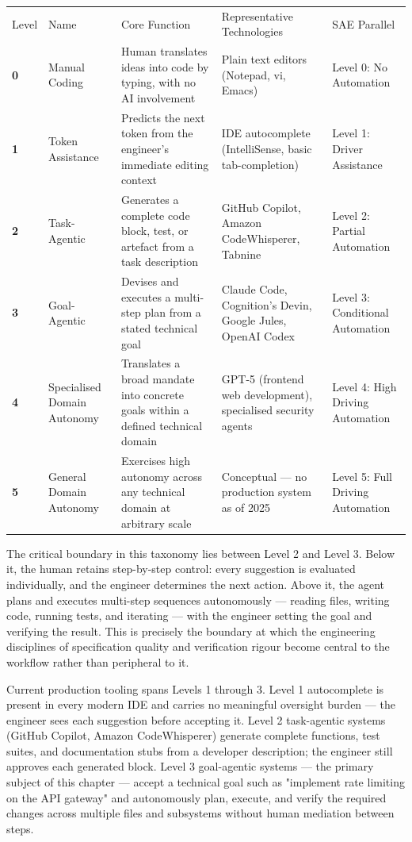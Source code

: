 \documentclass[11pt,a4paper]{book}
\begin{document}
\begin{tabular}{lllll}
\hline
Level & Name & Core Function & Representative Technologies & SAE Parallel \\
\textbf{0} & Manual Coding & Human translates ideas into code by typing, with no AI involvement & Plain text editors (Notepad, vi, Emacs) & Level 0: No Automation \\
\textbf{1} & Token Assistance & Predicts the next token from the engineer's immediate editing context & IDE autocomplete (IntelliSense, basic tab-completion) & Level 1: Driver Assistance \\
\textbf{2} & Task-Agentic & Generates a complete code block, test, or artefact from a task description & GitHub Copilot, Amazon CodeWhisperer, Tabnine & Level 2: Partial Automation \\
\textbf{3} & Goal-Agentic & Devises and executes a multi-step plan from a stated technical goal & Claude Code, Cognition's Devin, Google Jules, OpenAI Codex & Level 3: Conditional Automation \\
\textbf{4} & Specialised Domain Autonomy & Translates a broad mandate into concrete goals within a defined technical domain & GPT-5 (frontend web development), specialised security agents & Level 4: High Driving Automation \\
\textbf{5} & General Domain Autonomy & Exercises high autonomy across any technical domain at arbitrary scale & Conceptual --- no production system as of 2025 & Level 5: Full Driving Automation \\
\hline
\end{tabular}

The critical boundary in this taxonomy lies between Level 2 and Level 3. Below it, the human retains step-by-step control: every suggestion is evaluated individually, and the engineer determines the next action. Above it, the agent plans and executes multi-step sequences autonomously --- reading files, writing code, running tests, and iterating --- with the engineer setting the goal and verifying the result. This is precisely the boundary at which the engineering disciplines of specification quality and verification rigour become central to the workflow rather than peripheral to it.

Current production tooling spans Levels 1 through 3. Level 1 autocomplete is present in every modern IDE and carries no meaningful oversight burden --- the engineer sees each suggestion before accepting it. Level 2 task-agentic systems (GitHub Copilot, Amazon CodeWhisperer) generate complete functions, test suites, and documentation stubs from a developer description; the engineer still approves each generated block. Level 3 goal-agentic systems --- the primary subject of this chapter --- accept a technical goal such as "implement rate limiting on the API gateway" and autonomously plan, execute, and verify the required changes across multiple files and subsystems without human mediation between steps.
\end{document}
